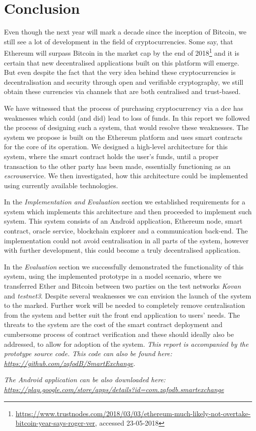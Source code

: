 \section{Conclusion}\label{sec:conclusion}

Even though the next year will mark a decade since the inception of Bitcoin, we still see a lot of development in the field of cryptocurrencies. Some say, that Ethereum will surpass Bitcoin in the market cap by the end of 2018\footnote{\url{https://www.trustnodes.com/2018/03/03/ethereum-much-likely-not-overtake-bitcoin-year-says-roger-ver}, accessed 23-05-2018} and it is certain that new decentralised applications built on this platform will emerge. But even despite the fact that the very idea behind these cryptocurrencies is decentralisation and security through open and verifiable cryptography, we still obtain these currencies via channels that are both centralised and trust-based.

We have witnessed that the process of purchasing cryptocurrency via a \acrshort{dce} has weaknesses which could (and did) lead to loss of funds. In this report we followed the process of designing such a system, that would resolve these weaknesses. The system we propose is built on the Ethereum platform and uses smart contracts for the core of its operation. We designed a high-level architecture for this system, where the smart contract holds the user's funds, until a proper transaction to the other party has been made, essentially functioning as an \textit{escrow}\footnotemark service. We then investigated, how this architecture could be implemented using currently available technologies.

In the \textit{Implementation and Evaluation} section we established requirements for a system which implements this architecture and then proceeded to implement such system. This system consists of an Android application, Ethereum node, smart contract, oracle service, blockchain explorer and a communication back-end. The implementation could not avoid centralisation in all parts of the system, however with further development, this could become a truly decentralised application.
% 

In the \textit{Evaluation} section we successfully demonstrated the functionality of this system, using the implemented prototype in a model scenario, where we transferred Ether and Bitcoin between two parties on the test networks \textit{Kovan} and \textit{testnet3}. Despite several weaknesses we can envision the launch of the system to the marked. Further work will be needed to completely remove centralisation from the system and better suit the front end application to users' needs. The threats to the system are the cost of the smart contract deployment and cumbersome process of contract verification and these should ideally also be addressed, to allow for adoption of the system.
\vfill
\textit{This report is accompanied by the prototype source code. This code can also be found here: \url{https://github.com/zafodB/SmartExchange}.}

\textit{The Android application can be also downloaded here: \url{https://play.google.com/store/apps/details?id=com.zafodb.smartexchange}}
